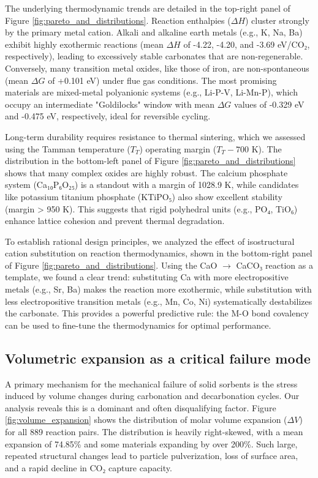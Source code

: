 \documentclass[]{article}
\begin{document}
The underlying thermodynamic trends are detailed in the top-right panel of Figure \ref{fig:pareto_and_distributions}. Reaction enthalpies ($\Delta H$) cluster strongly by the primary metal cation. Alkali and alkaline earth metals (e.g., K, Na, Ba) exhibit highly exothermic reactions (mean $\Delta H$ of -4.22, -4.20, and -3.69 eV/CO₂, respectively), leading to excessively stable carbonates that are non-regenerable. Conversely, many transition metal oxides, like those of iron, are non-spontaneous (mean $\Delta G$ of +0.101 eV) under flue gas conditions. The most promising materials are mixed-metal polyanionic systems (e.g., Li-P-V, Li-Mn-P), which occupy an intermediate "Goldilocks" window with mean $\Delta G$ values of -0.329 eV and -0.475 eV, respectively, ideal for reversible cycling.

Long-term durability requires resistance to thermal sintering, which we assessed using the Tamman temperature ($T_T$) operating margin ($T_T - 700$ K). The distribution in the bottom-left panel of Figure \ref{fig:pareto_and_distributions} shows that many complex oxides are highly robust. The calcium phosphate system (Ca₁₀P₆O₂₅) is a standout with a margin of 1028.9 K, while candidates like potassium titanium phosphate (KTiPO₅) also show excellent stability (margin > 950 K). This suggests that rigid polyhedral units (e.g., PO₄, TiO₆) enhance lattice cohesion and prevent thermal degradation.

To establish rational design principles, we analyzed the effect of isostructural cation substitution on reaction thermodynamics, shown in the bottom-right panel of Figure \ref{fig:pareto_and_distributions}. Using the CaO $\rightarrow$ CaCO₃ reaction as a template, we found a clear trend: substituting Ca with more electropositive metals (e.g., Sr, Ba) makes the reaction more exothermic, while substitution with less electropositive transition metals (e.g., Mn, Co, Ni) systematically destabilizes the carbonate. This provides a powerful predictive rule: the M-O bond covalency can be used to fine-tune the thermodynamics for optimal performance.

\subsection{Volumetric expansion as a critical failure mode}
A primary mechanism for the mechanical failure of solid sorbents is the stress induced by volume changes during carbonation and decarbonation cycles. Our analysis reveals this is a dominant and often disqualifying factor. Figure \ref{fig:volume_expansion} shows the distribution of molar volume expansion ($\Delta V$) for all 889 reaction pairs. The distribution is heavily right-skewed, with a mean expansion of 74.85\% and some materials expanding by over 200\%. Such large, repeated structural changes lead to particle pulverization, loss of surface area, and a rapid decline in CO₂ capture capacity.
\end{document}
